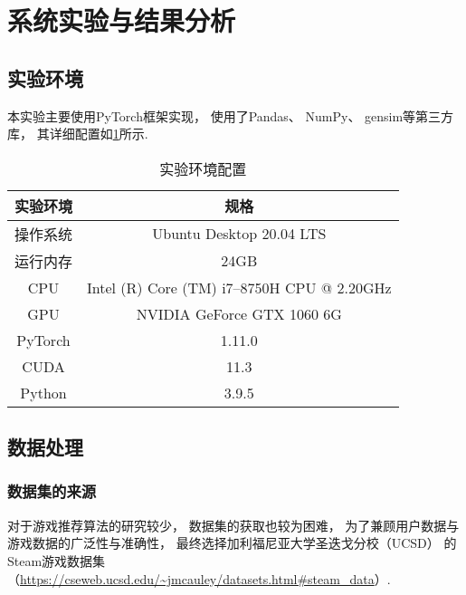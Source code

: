 \section{系统实验与结果分析}

\subsection{实验环境}

本实验主要使用PyTorch框架实现，
使用了Pandas、
NumPy、
gensim等第三方库，
其详细配置如\cref{tb:device}所示.

\begin{table}[!htbp]
  \begin{center}
    \caption{实验环境配置}\label{tb:device}
    \begin{tabular}{cc}
      \toprule
      实验环境    & 规格                                          \\
      \midrule
      操作系统    & Ubuntu Desktop 20.04 LTS                    \\
      运行内存    & 24GB                                        \\
      CPU     & Intel (R) Core (TM) i7--8750H CPU @ 2.20GHz \\
      GPU     & NVIDIA GeForce GTX 1060 6G                  \\
      PyTorch & 1.11.0                                      \\
      CUDA    & 11.3                                        \\
      Python  & 3.9.5                                       \\
      \bottomrule
    \end{tabular}
  \end{center}
\end{table}

\subsection{数据处理}

\subsubsection{数据集的来源}

对于游戏推荐算法的研究较少，
数据集的获取也较为困难，
为了兼顾用户数据与游戏数据的广泛性与准确性，
最终选择加利福尼亚大学圣迭戈分校（UCSD）
的Steam游戏数据集
（\url{https://cseweb.ucsd.edu/~jmcauley/datasets.html#steam_data}）.

